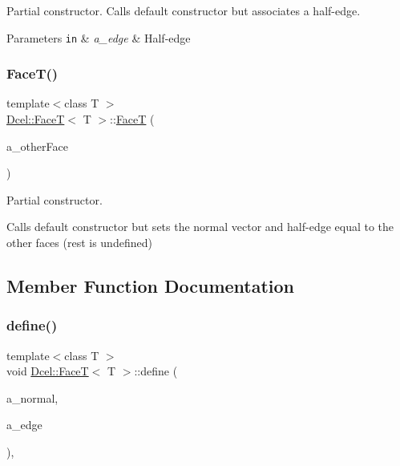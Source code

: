 Partial constructor. Calls default constructor but associates a half-\/edge. 


\begin{DoxyParams}[1]{Parameters}
\mbox{\tt in}  & {\em a\+\_\+edge} & Half-\/edge \\
\hline
\end{DoxyParams}
\mbox{\label{classDcel_1_1FaceT_a0c318a29cae34ba4105235fd55d22b39}} 
\subsubsection{\texorpdfstring{Face\+T()}{FaceT()}\hspace{0.1cm}{\footnotesize\ttfamily [2/2]}}
{\footnotesize\ttfamily template$<$class T $>$ \\
\hyperlink{classDcel_1_1FaceT}{Dcel\+::\+FaceT}$<$ T $>$\+::\hyperlink{classDcel_1_1FaceT}{FaceT} (\begin{DoxyParamCaption}\item[{const \hyperlink{classDcel_1_1FaceT_a01d61241adc3c536c364084740b8c6da}{Face} \&}]{a\+\_\+other\+Face }\end{DoxyParamCaption})\hspace{0.3cm}{\ttfamily [inline]}}



Partial constructor. 

Calls default constructor but sets the normal vector and half-\/edge equal to the other face\textquotesingle{}s (rest is undefined) 

\subsection{Member Function Documentation}
\mbox{\label{classDcel_1_1FaceT_a44b70fa51382ef625d110bbad64b7442}} 
\subsubsection{\texorpdfstring{define()}{define()}}
{\footnotesize\ttfamily template$<$class T $>$ \\
void \hyperlink{classDcel_1_1FaceT}{Dcel\+::\+FaceT}$<$ T $>$\+::define (\begin{DoxyParamCaption}\item[{const \hyperlink{classDcel_1_1FaceT_ade9c182834ec6f18a0e17b8140308db2}{Vec3} \&}]{a\+\_\+normal,  }\item[{const \hyperlink{classDcel_1_1FaceT_a0f3448c4cf108341e48029b8040c7cec}{Edge\+Ptr} \&}]{a\+\_\+edge }\end{DoxyParamCaption})\hspace{0.3cm}{\ttfamily [inline]}, {\ttfamily [noexcept]}}



